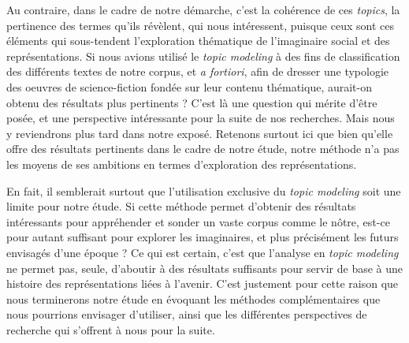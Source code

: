 \documentclass[letterpaper,portrait,12pt]{article}
\begin{document}
\textcolor[rgb]{0.000,0.000,0.000}{	Au contraire, dans le cadre de notre d\'{e}marche, c'est la coh\'{e}rence de ces }\emph{\textcolor[rgb]{0.000,0.000,0.000}{topics}}\textcolor[rgb]{0.000,0.000,0.000}{, la pertinence des termes qu'ils r\'{e}v\`{e}lent, qui nous int\'{e}ressent, puisque ceux sont ces \'{e}l\'{e}ments qui sous-tendent l'exploration th\'{e}matique de l'imaginaire social et des repr\'{e}sentations. Si nous avions utilis\'{e} le }\emph{\textcolor[rgb]{0.000,0.000,0.000}{topic modeling}}\textcolor[rgb]{0.000,0.000,0.000}{ \`{a} des fins de classification des diff\'{e}rents textes de notre corpus, et }\emph{\textcolor[rgb]{0.000,0.000,0.000}{a fortiori}}\textcolor[rgb]{0.000,0.000,0.000}{, afin de dresser une typologie des oeuvres de science-fiction fond\'{e}e sur leur contenu th\'{e}matique, aurait-on obtenu des r\'{e}sultats plus pertinents ? C'est l\`{a} une question qui m\'{e}rite d'\^{e}tre pos\'{e}e, et une perspective int\'{e}ressante pour la suite de nos recherches. Mais nous y reviendrons plus tard dans notre expos\'{e}. Retenons surtout ici que bien qu'elle offre des r\'{e}sultats pertinents dans le cadre de notre \'{e}tude, notre m\'{e}thode n'a pas les moyens de ses ambitions en termes d'exploration des repr\'{e}sentations.}





\textcolor[rgb]{0.000,0.000,0.000}{	En fait, il semblerait surtout que l'utilisation exclusive du }\emph{\textcolor[rgb]{0.000,0.000,0.000}{topic modeling}}\textcolor[rgb]{0.000,0.000,0.000}{ soit une limite pour notre \'{e}tude. Si cette m\'{e}thode permet d'obtenir des r\'{e}sultats int\'{e}ressants pour appr\'{e}hender et sonder un vaste corpus comme le n\^{o}tre, est-ce pour autant suffisant pour explorer les imaginaires, et plus pr\'{e}cis\'{e}ment les futurs envisag\'{e}s d'une \'{e}poque ? Ce qui est certain, c'est que l'analyse en }\emph{\textcolor[rgb]{0.000,0.000,0.000}{topic modeling}}\textcolor[rgb]{0.000,0.000,0.000}{ ne permet pas, seule, d'aboutir \`{a} des r\'{e}sultats suffisants pour servir de base \`{a} une histoire des repr\'{e}sentations li\'{e}es \`{a} l'avenir. C'est justement pour cette raison que nous terminerons notre \'{e}tude en \'{e}voquant les m\'{e}thodes compl\'{e}mentaires que nous pourrions envisager d'utiliser, ainsi que les diff\'{e}rentes perspectives de recherche qui s'offrent \`{a} nous pour la suite.}
\end{document}
